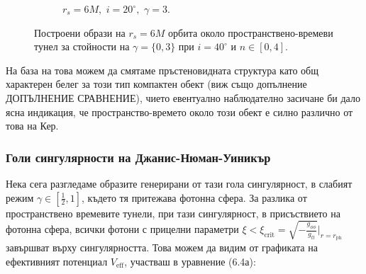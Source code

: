 \begin{figure}[!htb]
\begin{subfigure}{6cm}
		\caption{$r_s = 6M,\,\, i = 20^\circ,\,\,\gamma = 3$.}
	\end{subfigure}
	\caption[Построени образи на $r_s = 6M$ орбита около пространствено-времеви тунел за различни стойности на $\gamma$ при $i \ 20^\circ$.]{\small Построени образи на $r_s = 6M$ орбита около пространствено-времеви тунел за стойности на $\gamma = \{0, 3\}$ при $i = 40^\circ$ и $n\in[0,4]$.} 
	\label{WH_gamma_20_deg}
\end{figure}
На база на това можем да смятаме пръстеновидната структура като общ характерен белег за този тип компактен обект (виж също допълнение ДОПЪЛНЕНИЕ СРАВНЕНИЕ), чието евентуално наблюдателно засичане би дало ясна индикация, че пространство-времето около този обект е силно различно от това на Кер.
\newpage
\subsubsection{Голи сингулярности на Джанис-Нюман-Уиникър}

Нека сега разгледаме образите генерирани от тази гола сингулярност, в слабият режим $\gamma\in\left[\frac{1}{2},1\right]$, където тя притежава фотонна сфера. За разлика от пространствено времевите тунели, при тази сингулярност, в присъствието на фотонна сфера, всички фотони с прицелни параметри $\xi <\xi_\text{crit} = \sqrt{-\frac{g_{\phi\phi}}{g_{tt}}}\big\vert_{r = r_\text{ph}}$ завършват върху сингулярността. Това можем да видим от графиката на ефективният потенциал $V_\text{eff}$, участваш в уравнение (6.4а):

